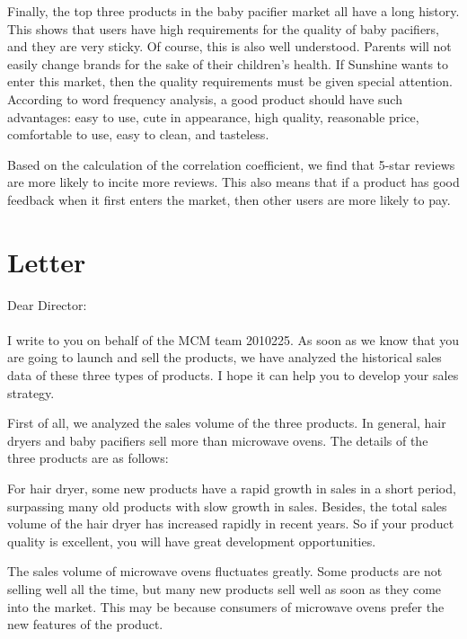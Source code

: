 \documentclass{mcmthesis}
\begin{document}
	Finally, the top three products in the baby pacifier market all have a long history. This shows that users have high requirements for the quality of baby pacifiers, and they are very sticky. Of course, this is also well understood. Parents will not easily change brands for the sake of their children's health. If Sunshine wants to enter this market, then the quality requirements must be given special attention. According to word frequency analysis, a good product should have such advantages: easy to use, cute in appearance, high quality, reasonable price, comfortable to use, easy to clean, and tasteless.
	
	Based on the calculation of the correlation coefficient, we find that 5-star reviews are more likely to incite more reviews. This also means that if a product has good feedback when it first enters the market, then other users are more likely to pay.
	
	\newpage
	
	\section{Letter}
	\begin{flushleft}
		Dear Director:
	\end{flushleft}
	\paragraph{}
	I write to you on behalf of the MCM team 2010225. As soon as we know that you are going to launch and sell the products, we have analyzed the historical sales data of these three types of products. I hope it can help you to develop your sales strategy.
	
	    First of all, we analyzed the sales volume of the three products. 
	In general, hair dryers and baby pacifiers sell more than microwave ovens. The details of the three products are as follows:
	
	For hair dryer, some new products have a rapid growth in sales in a short period, surpassing many old products with slow growth in sales. Besides, the total sales volume of the hair dryer has increased rapidly in recent years. So if your product quality is excellent, you will have great development opportunities. 
	
	The sales volume of microwave ovens fluctuates greatly. Some products are not selling well all the time, but many new products sell well as soon as they come into the market. This may be because consumers of microwave ovens prefer the new features of the product.
	
\end{document}
